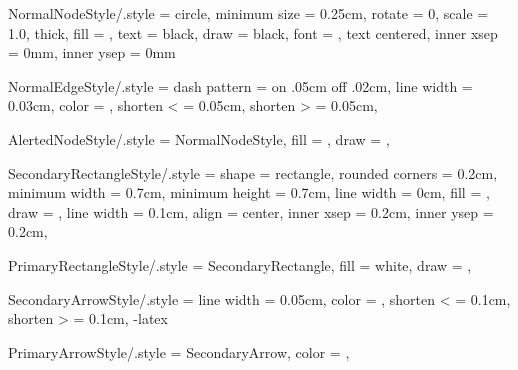 \newcommand{\InsertImageAt}[5] %
{
	\begin{tikzpicture}[remember picture, overlay]
	\node
	[
		shape			= rectangle,		%
		minimum height	= #2cm,				%
		minimum width	= #3cm,				%
		xshift 			= #4cm,
		yshift			= #5cm,
 		path picture	=
		{\node at (path picture bounding box.center)
		{\includegraphics[height = #2cm, width = #3cm]
		{#1}};}
	]
	at (current page.center)
	{};
	\end{tikzpicture}
}

\newcommand{\InsertTextAt}[3] %
{
	\begin{tikzpicture}[remember picture, overlay]
	\node
	[
		shape			= rectangle,		%
		xshift 			= #2cm,
		yshift			= #3cm,
	]
	at (current page.center)
	{#1};
	\end{tikzpicture}
}

\tikzset
{
	NormalNodeStyle/.style =
	{
		circle,									%
		minimum size	= 0.25cm,				%
		rotate			= 0,					%
		scale			= 1.0,					%
		thick,									%
		fill			= \LightGray,			%
		text			= black,				%
		draw			= black,				%
		font			= \scriptsize,			%
		text centered,							%
		inner xsep		= 0mm,					%
		inner ysep		= 0mm					%
	}
}


\tikzset
{
	NormalEdgeStyle/.style = 
	{
		dash pattern	= on .05cm off .02cm,
		line width		= 0.03cm,
		color 			= \DarkGray,
		shorten	<		= 0.05cm,
		shorten	>		= 0.05cm,
	}
}


\tikzset
{
	AlertedNodeStyle/.style =
	{
		NormalNodeStyle,						%
		fill			= \SoftPrimary,			%
		draw			= \StrongPrimary,		%
	}
}


\tikzset
{
	SecondaryRectangleStyle/.style =
	{
		shape			= rectangle,		%
		rounded corners	= 0.2cm,			%
		minimum width	= 0.7cm,			%
		minimum height	= 0.7cm,			%
		line width		= 0cm,				%
		fill			= \SoftSecondary,		%
		draw			= \SoftSecondary,		%
		line width		= 0.1cm,			%
		align			= center,			%
		inner xsep		= 0.2cm,			%
		inner ysep		= 0.2cm,			%
	}
}


\tikzset
{
	PrimaryRectangleStyle/.style =
	{
		SecondaryRectangle,
		fill			= white,
		draw			= \StrongPrimary,
	}
}


\tikzset
{
	SecondaryArrowStyle/.style =
	{
		line width		= 0.05cm,
		color			= \SoftSecondary,
		shorten <		= 0.1cm,
		shorten >		= 0.1cm,
		-latex
	}
}


\tikzset
{
	PrimaryArrowStyle/.style =
	{
		SecondaryArrow,
		color			= \SoftPrimary,
	}
}

